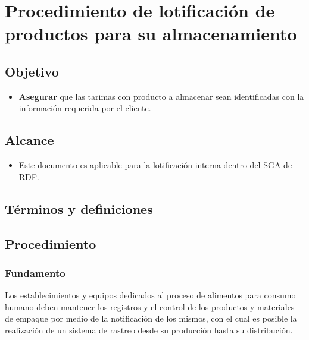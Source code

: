 \thispagestyle{formato-PI}
\renewcommand{\MayorVer}{2}
\renewcommand{\MenorVer}{0}
\renewcommand{\Codigo}{PSA-2-PRO}
\renewcommand{\FechaPub}{2023--01}
\renewcommand{\TipoID}{PRO}
\renewcommand{\Titulo}{Procedimiento de lotificación de productos para su almacenamiento}

\section{\Titulo}
\renewcommand{\Codigo}{\Prog--\thesection--\TipoID}

\subsection{Objetivo}

\begin{itemize}
	\item \textbf{Asegurar} que las tarimas con producto a almacenar sean identificadas con la información requerida por el cliente.
\end{itemize}

\subsection{Alcance}
\begin{itemize}
	\item Este documento es aplicable para la lotificación interna dentro del \gls{SGA} de \gls{RDF}.
\end{itemize}

\subsection{Términos y definiciones}
\begin{description}
\end{description}

\subsection{Procedimiento}

\subsubsection{Fundamento}
Los establecimientos y equipos dedicados al proceso de alimentos para consumo humano deben mantener los registros y el control de los productos y materiales de empaque por medio de la notificación de los mismos, con el cual es posible la realización de un sistema de rastreo desde su producción hasta su distribución.

